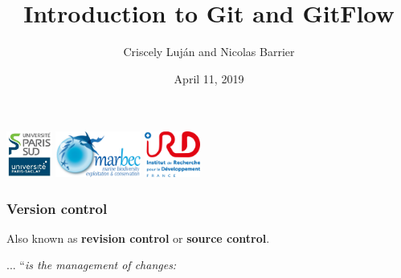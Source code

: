 \documentclass{beamer}
\title[Version control, Git, GitHub and GitFlow]{Introduction to Git and GitFlow}
\author{Criscely Luj\'{a}n and Nicolas Barrier}
\institute[Universit\'{e} Paris-Sud, UMR MARBEC]  
{Universit\'{e} Paris-Sud, UMR MARBEC \\ 
\medskip
\textit{criscely.lujan@ird.fr}}
\date{April 11, 2019}
\begin{document}
\begin{frame}
\titlepage 
\begin{center}
\includegraphics[height=1.5cm]{img/logo_psud.jpg}
\hspace{1em}
\includegraphics[height=1.5cm]{img/logo_marbec.png}
\hspace{1em}
\includegraphics[height=1.5cm]{img/logo_ird.png}
\end{center}
\end{frame}


\begin{frame}
\frametitle{Version control}

Also known as \textbf{revision control} or \textbf{source control}. \hfill \break

... ``\textit{is the management of changes:}

\end{frame}
\end{document}
